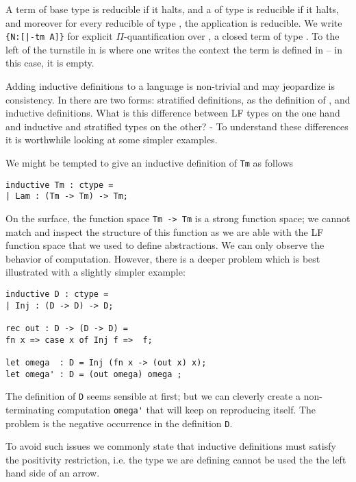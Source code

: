 A term of base type  is reducible if it halts, and a  of type
 is reducible if it halts, and moreover for every reducible
 of type , the application  is reducible. We write
\lstinline!{N:[|-tm A]}! for explicit $\Pi$-quantification over , a closed term
of type . To the left of the turnstile in \bel{[|- tm A]} is where one
writes the context the term is defined in -- in this case, it is empty.


Adding inductive definitions to a language is non-trivial and may
jeopardize is consistency. In \beluga there are two forms: stratified
definitions, as the definition of , and inductive definitions.
What is this difference between LF types on the one hand and inductive and
stratified types on the other? - To understand these differences it is
worthwhile looking at some simpler examples.

We might be tempted to give an inductive
definition of \texttt{Tm} as follows

\begin{lstlisting}
inductive Tm : ctype =
| Lam : (Tm -> Tm) -> Tm;
\end{lstlisting}

On the surface, the function space \verb+Tm -> Tm+
is a strong function space; we cannot match and inspect the structure
of this function as we are able with the LF function space that we
used to define abstractions. We can only observe the behavior of
computation. However, there is a deeper problem which is best
illustrated with a slightly simpler example:

\begin{lstlisting}
inductive D : ctype = 
| Inj : (D -> D) -> D;

rec out : D -> (D -> D) = 
fn x => case x of Inj f =>  f;

let omega  : D = Inj (fn x -> (out x) x);
let omega' : D = (out omega) omega ; 
\end{lstlisting}

The definition of \verb+D+ seems sensible at first; but we can
cleverly create a non-terminating computation \verb+omega'+ that
will keep on reproducing itself. The problem is the negative occurrence
in the definition \verb+D+. 

To avoid such issues we commonly state that inductive definitions must
satisfy the positivity restriction, i.e. the type we are defining
cannot be used the the left hand side of an arrow. 

